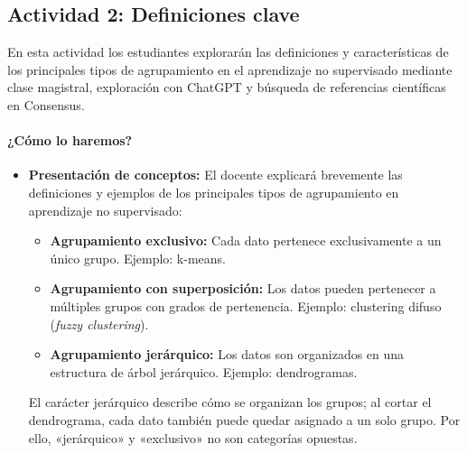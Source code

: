 \documentclass[a4,11pt]{aleph-notas}
\begin{document}
\subsection*{Actividad 2: Definiciones clave}

En esta actividad los estudiantes explorarán las definiciones y características de los principales tipos de agrupamiento en el aprendizaje no supervisado mediante clase magistral, exploración con ChatGPT y búsqueda de referencias científicas en Consensus.

\paragraph{¿Cómo lo haremos?}  
\begin{itemize}[leftmargin=*]
    \item \textbf{Presentación de conceptos:}  
    El docente explicará brevemente las definiciones y ejemplos de los principales tipos de agrupamiento en aprendizaje no supervisado:
    \begin{itemize}
        \item \textbf{Agrupamiento exclusivo:} Cada dato pertenece exclusivamente a un único grupo. Ejemplo: k-means.
        \item \textbf{Agrupamiento con superposición:} Los datos pueden pertenecer a múltiples grupos con grados de pertenencia. Ejemplo: clustering difuso (\textit{fuzzy clustering}).
        \item \textbf{Agrupamiento jerárquico:} Los datos son organizados en una estructura de árbol jerárquico. Ejemplo: dendrogramas.
    \end{itemize}
    El carácter jerárquico describe cómo se organizan los grupos; al cortar el dendrograma, cada dato también puede quedar asignado a un solo grupo. Por ello, «jerárquico» y «exclusivo» no son categorías opuestas.
    

\end{itemize}
\end{document}
